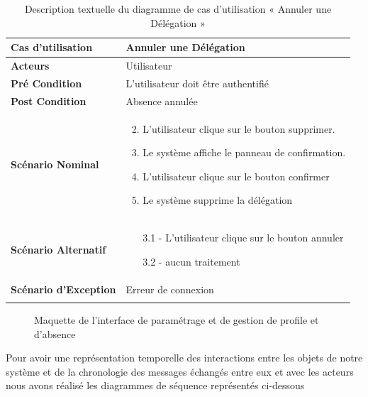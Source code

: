 \begin{longtable}{|p{5cm}|p{10cm}|}
\hline
\textbf{Cas d'utilisation}&Annuler une Délégation       \\
\hline
\textbf{Acteurs}&Utilisateur\\
\hline
\textbf{Pré Condition}&L'utilisateur doit être authentifié\\
\hline
\textbf{Post Condition}&Absence annulée \\
\hline
\textbf{Scénario Nominal}&
\vspace{-\baselineskip}
\begin{enumerate}
  \setcounter{enumi}{1}
  \item L'utilisateur clique sur le bouton supprimer.
  \item Le système affiche le panneau de confirmation.
  \item L'utilisateur clique sur le bouton confirmer
  \item Le système supprime la délégation 
\end{enumerate}\\
\hline
\textbf{Scénario Alternatif}&
\vspace{-\baselineskip}
\begin{enumerate}
  \item [3.1]- L'utilisateur clique sur le bouton annuler
  \item [3.2]- aucun traitement
\end{enumerate}\\
\hline
\textbf{Scénario d'Exception}&
Erreur de connexion\\
\hline
\caption{Description textuelle du diagramme de cas d'utilisation « Annuler une Délégation       »}
\label{tab:use_case_cancel_delegate}
\end{longtable}

\begin{figure}[H]
  \centering
  \caption{Maquette de l’interface de paramétrage et de gestion de profile et d'absence}
  \label{fig:MaquetteInterfaceParametrageGestionAbsences}
\end{figure}


Pour avoir une représentation temporelle des interactions entre les objets de notre système et de la chronologie des messages échangés entre eux et avec les acteurs nous avons réalisé les diagrammes de séquence représentés ci-dessous

